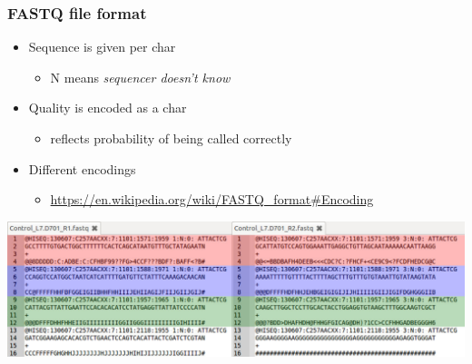 \documentclass{beamer}			  %
\begin{document}
\begin{frame}
	\frametitle{FASTQ file format}
	\begin{itemize}
		\item Sequence is given per char
		\begin{itemize}
			\item N means \textit{sequencer doesn’t know}
		\end{itemize}
		\item Quality is encoded as a char
		\begin{itemize}
			\item reflects probability of being called correctly
		\end{itemize}
		\item Different encodings
		\begin{itemize}
			\item {\scriptsize \url{https://en.wikipedia.org/wiki/FASTQ\_format\#Encoding}}
		\end{itemize}
	\end{itemize}
	\begin{center}
		\includegraphics[width=\textwidth]{figures/dge_03bp.png}
	\end{center}
\end{frame}
\end{document}
